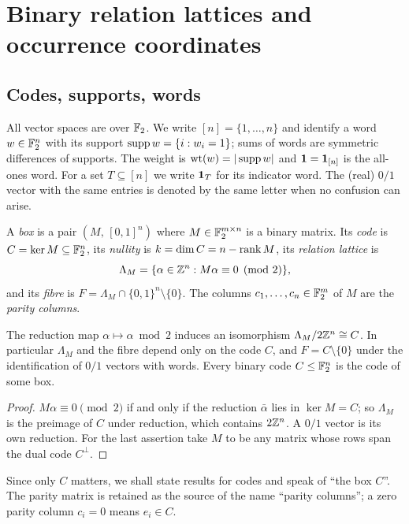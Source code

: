 \section{Binary relation lattices and occurrence coordinates}\label{sec:binary}

\subsection{Codes, supports, words}

All vector spaces are over $\mathbb F_2$. We write $[n]=\{1,\dots,n\}$ and identify a word $w\in\mathbb F_2^n$ with its support $\operatorname{supp} w=\{i: w_i=1\}$; sums of words are symmetric differences of supports. The weight is $\operatorname{wt}(w)=|\operatorname{supp} w|$ and $\mathbf 1=\mathbf 1_{[n]}$ is the all-ones word. For a set $T\subseteq[n]$ we write $\mathbf 1_T$ for its indicator word. The (real) $0/1$ vector with the same entries is denoted by the same letter when no confusion can arise.

\begin{definition}[Box]\label{def:box}
A \emph{box} is a pair $(M,\,[0,1]^n)$ where $M\in\mathbb F_2^{m\times n}$ is a binary matrix. Its \emph{code} is $C=\ker M\subseteq\mathbb F_2^n$, its \emph{nullity} is $k=\dim C=n-\operatorname{rank} M$, its \emph{relation lattice} is
\[
\Lambda_M=\{\alpha\in\mathbb Z^n: M\alpha\equiv 0\pmod 2\},
\]
and its \emph{fibre} is $F=\Lambda_M\cap\{0,1\}^n\setminus\{0\}$. The columns $c_1,\dots,c_n\in\mathbb F_2^m$ of $M$ are the \emph{parity columns}.
\end{definition}

\begin{lemma}\label{lem:lattice-code}
The reduction map $\alpha\mapsto\alpha\bmod2$ induces an isomorphism $\Lambda_M/2\mathbb Z^n\cong C$. In particular $\Lambda_M$ and the fibre depend only on the code $C$, and $F=C\setminus\{0\}$ under the identification of $0/1$ vectors with words. Every binary code $C\le\mathbb F_2^n$ is the code of some box.
\end{lemma}

\begin{proof}
$M\alpha\equiv0 \pmod 2$ if and only if the reduction $\bar\alpha$ lies in $\ker M=C$; so $\Lambda_M$ is the preimage of $C$ under reduction, which contains $2\mathbb Z^n$. A $0/1$ vector is its own reduction. For the last assertion take $M$ to be any matrix whose rows span the dual code $C^\perp$.
\end{proof}

Since only $C$ matters, we shall state results for codes and speak of ``the box $C$''. The parity matrix is retained as the source of the name ``parity columns''; a zero parity column $c_i=0$ means $e_i\in C$.

